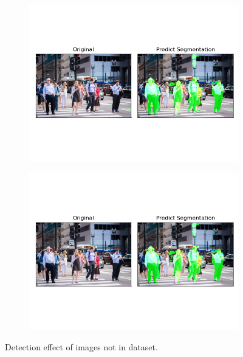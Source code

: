 \documentclass[12pt, a4paper]{article}
\begin{document}
	\begin{figure}[h!]
	  \centering
	  \begin{subfigure}[b]{0.45\linewidth}
	    \includegraphics[width=\linewidth]{predict1.png}
	  \end{subfigure}
	  \begin{subfigure}[b]{0.45\linewidth}
	    \includegraphics[width=\linewidth]{predict1.png}
	  \end{subfigure}
	  \caption{Detection effect of images not in dataset.}
	  \label{fig:result2}
	\end{figure}

\end{document}
